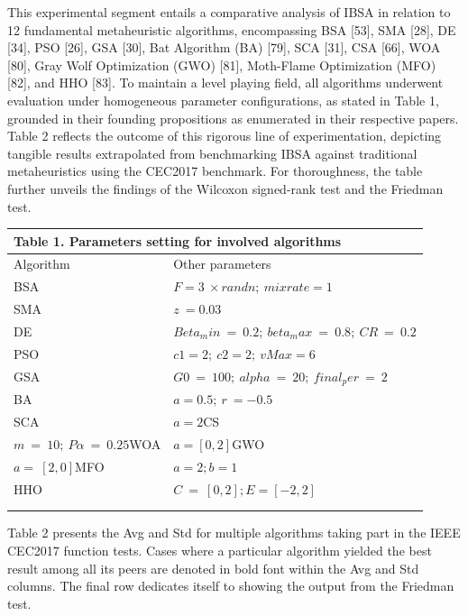 \documentclass{article} %
\begin{document}
This experimental segment entails a comparative analysis of IBSA in relation to 12 fundamental metaheuristic algorithms, encompassing BSA [53], SMA [28], DE [34], PSO [26], GSA [30], Bat Algorithm (BA) [79], SCA [31], CSA [66], WOA [80], Gray Wolf Optimization (GWO) [81], Moth-Flame Optimization (MFO) [82], and HHO [83]. To maintain a level playing field, all algorithms underwent evaluation under homogeneous parameter configurations, as stated in Table 1, grounded in their founding propositions as enumerated in their respective papers. Table 2 reflects the outcome of this rigorous line of experimentation, depicting tangible results extrapolated from benchmarking IBSA against traditional metaheuristics using the CEC2017 benchmark. For thoroughness, the table further unveils the findings of the Wilcoxon signed-rank test and the Friedman test.

\begin{tabular}{|p{1.1in}|p{2.8in}|} \hline 
\multicolumn{2}{|p{1in}|}{\textbf{Table }1\textbf{.} Parameters setting for involved algorithms} \\ \hline 
Algorithm & Other parameters \\ \hline 
BSA & $F=3\ \times randn;\ mixrate=1\ $\textit{} \\ \hline 
SMA & $z\ =0.03$\textit{} \\ \hline 
DE & $Beta_min\ =\ 0.2;\ beta_max\ =\ 0.8;\ CR\ =\ 0.2$\textit{} \\ \hline 
PSO & $c1=2;\ c2=2;\ vMax=6$\textit{} \\ \hline 
GSA & $G0\ =\ 100;\ alpha\ =\ 20;\ final_per\ =\ 2$\textit{} \\ \hline 
BA & $a=0.5;\ r\ =-0.5$\textit{} \\ \hline 
SCA & $a=2$CS \\ \hline 
$m\ =\ 10;\ Pα\ =\ 0.25$WOA & $a=\left[0,2\right]$GWO \\ \hline 
$a=\ \left[2,0\right]$MFO & $a=2;b=1$\textit{} \\ \hline 
HHO & $C\ =\ \left[0,2\right];E=\left[-2,2\right]$\textit{} \\ \hline 
 \\ \hline 
 \\ \hline 
\end{tabular}



Table 2 presents the Avg and Std for multiple algorithms taking part in the IEEE CEC2017 function tests. Cases where a particular algorithm yielded the best result among all its peers are denoted in bold font within the Avg and Std columns. The final row dedicates itself to showing the output from the Friedman test.
\end{document}
